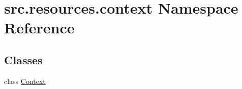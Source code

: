 \hypertarget{namespacesrc_1_1resources_1_1context}{\section{src.\+resources.\+context Namespace Reference}
\label{namespacesrc_1_1resources_1_1context}
}
\subsection*{Classes}
\begin{DoxyCompactItemize}
\item 
class \hyperlink{classsrc_1_1resources_1_1context_1_1_context}{Context}
\end{DoxyCompactItemize}
